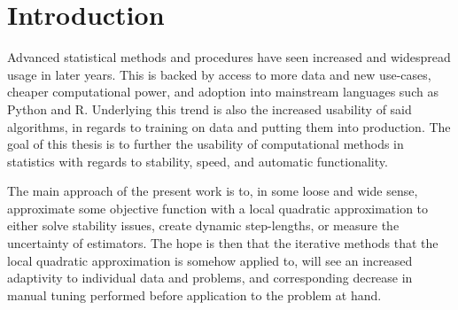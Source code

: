 \chapter{Introduction}

Advanced statistical methods and procedures have seen increased and widespread usage in later years.
This is backed by access to more data and new use-cases, cheaper computational power, and adoption into mainstream languages such as Python and R.
Underlying this trend is also the increased usability of said algorithms, in regards to training on data and putting them into production.
The goal of this thesis is to further the usability of computational methods in statistics with regards to stability, speed, and automatic functionality.

The main approach of the present work is to, in some loose and wide sense, approximate some objective function with a local quadratic approximation to either solve stability issues, create dynamic step-lengths, or measure the uncertainty of estimators.
The hope is then that the iterative methods that the local quadratic approximation is somehow applied to, will see an increased adaptivity to individual data and problems, and corresponding decrease in manual tuning performed before application to the problem at hand.

